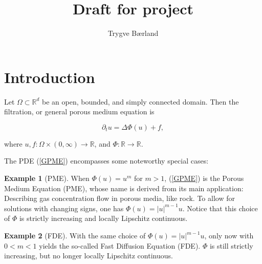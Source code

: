 \documentclass[11pt, a4paper]{article}
\begin{document}
\title{Draft for project}
\author{Trygve Bærland}
\maketitle
{}

\theoremstyle{plain}
\newtheorem{theorem}{Theorem}[section]
\newtheorem{proposition}{Proposition}[section]
\newtheorem{cor}{Corollary}[section]
\newtheorem{lemma}{Lemma}[section]

\newtheorem{assumption}{Assumption}

\theoremstyle{definition}
\newtheorem{mydef}{Definition}[section]
\newtheorem{example}{Example}%

\newtheorem{obs}{Observation}
\newtheorem{rem}{Remark}




\section{Introduction}

Let $\Omega \subset \mathbb{R}^d$ be an open, bounded, and simply connected domain. Then the filtration, or general porous medium equation is

\begin{equation}
\label{GPME}
	\partial_t u = \Delta \Phi(u) + f,
\end{equation}

 where $u, f: \Omega \times (0,\infty) \to \mathbb{R}$, and $\Phi: \mathbb{R} \to \mathbb{R}$.
 
The PDE (\ref{GPME}) encompasses some noteworthy special cases:
\begin{example}[PME]
When $\Phi(u) = u^m$ for $m>1$, (\ref{GPME}) is the Porous Medium Equation (PME), whose name is derived from its main application: Describing gas concentration flow in porous media, like rock. To allow for solutions with changing signs, one has $\Phi(u) = |u|^{m-1}u$. Notice that this choice of $\Phi$ is strictly increasing and locally Lipschitz continuous.
\end{example}

\begin{example}[FDE]
With the same choice of $\Phi(u) = |u|^{m-1}u$, only now with $0<m<1$ yields the so-called Fast Diffusion Equation (FDE). $\Phi$ is still strictly increasing, but no longer locally Lipschitz continuous.
\end{example}
\end{document}
